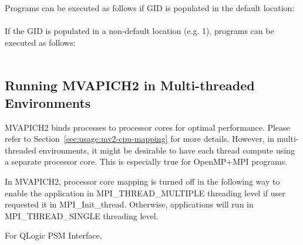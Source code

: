 Programs can be executed as follows if GID is populated in the default location: \\
\\


If the GID is populated in a non-default location (e.g. 1), programs can be executed as follows:\\
\\

\subsection{Running MVAPICH2 in Multi-threaded Environments}
\label{sec:advanced_multi_thread}

MVAPICH2 binds processes to processor cores for optimal performance.
Please refer to Section~\ref{sec:usage:mv2-cpu-mapping} for more details.
However, in multi-threaded environments, it might be desirable to have
each thread compute using a separate processor core. This is especially
true for OpenMP+MPI programs.

In MVAPICH2, processor core mapping is turned off in the
following way to enable
the application in MPI\_THREAD\_MULTIPLE threading level if user
requested it in MPI\_Init\_thread. Otherwise, applications will run in
MPI\_THREAD\_SINGLE threading level.


%


For QLogic PSM Interface,

